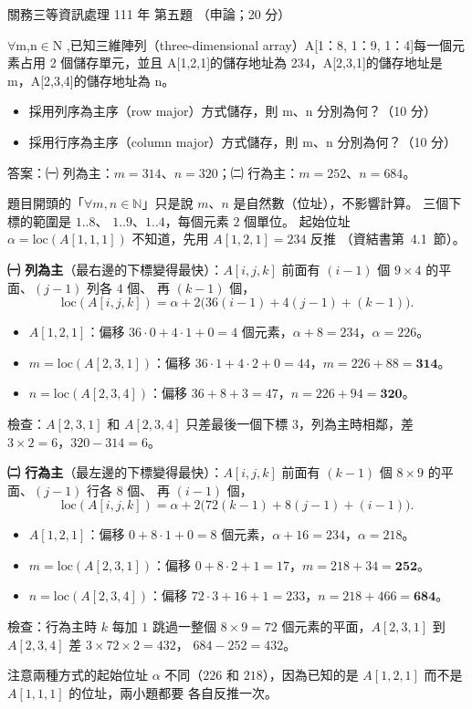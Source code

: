 \begin{pastexam}[label={px:gw3-111-ds-05}]{關務三等資訊處理 111 年 第五題}
（申論；20 分）

$\forall$m,n$\in$N ,已知三維陣列（three-dimensional array）A[1：8, 1：9, 1：4]每一個元素占用 2 個儲存單元，並且
A[1,2,1]的儲存地址為 234，A[2,3,1]的儲存地址是 m，A[2,3,4]的儲存地址為 n。
\begin{itemize}[leftmargin=2.2em]
\item[㈠] 採用列序為主序（row major）方式儲存，則 m、n 分別為何？（10 分）
\item[㈡] 採用行序為主序（column major）方式儲存，則 m、n 分別為何？（10 分）
\end{itemize}
\end{pastexam}

\begin{pastsoln}
答案：㈠ 列為主：$m = 314$、$n = 320$；㈡ 行為主：$m = 252$、$n = 684$。

題目開頭的「$\forall m, n \in \mathbb{N}$」只是說 $m$、$n$ 是自然數（位址），不影響計算。 三個下標的範圍是 $1..8$、
$1..9$、$1..4$，每個元素 $2$ 個單位。 起始位址 $\alpha = \mathrm{loc}(A[1,1,1])$ 不知道，先用 $A[1,2,1] = 234$ 反推
（資結書第~4.1~節）。

\textbf{㈠ 列為主}（最右邊的下標變得最快）：$A[i, j, k]$ 前面有 $(i - 1)$ 個 $9 \times 4$ 的平面、$(j - 1)$ 列各 $4$ 個、
再 $(k - 1)$ 個，
\[
\mathrm{loc}(A[i, j, k]) = \alpha + 2\bigl(36(i - 1) + 4(j - 1) + (k - 1)\bigr).
\]
\begin{itemize}
\item $A[1, 2, 1]$：偏移 $36 \cdot 0 + 4 \cdot 1 + 0 = 4$ 個元素，$\alpha + 8 = 234$，$\alpha = 226$。
\item $m = \mathrm{loc}(A[2, 3, 1])$：偏移 $36 \cdot 1 + 4 \cdot 2 + 0 = 44$，$m = 226 + 88 = \mathbf{314}$。
\item $n = \mathrm{loc}(A[2, 3, 4])$：偏移 $36 + 8 + 3 = 47$，$n = 226 + 94 = \mathbf{320}$。
\end{itemize}
檢查：$A[2,3,1]$ 和 $A[2,3,4]$ 只差最後一個下標 $3$，列為主時相鄰，差 $3 \times 2 = 6$，$320 - 314 = 6$。

\textbf{㈡ 行為主}（最左邊的下標變得最快）：$A[i, j, k]$ 前面有 $(k - 1)$ 個 $8 \times 9$ 的平面、$(j - 1)$ 行各 $8$ 個、
再 $(i - 1)$ 個，
\[
\mathrm{loc}(A[i, j, k]) = \alpha + 2\bigl(72(k - 1) + 8(j - 1) + (i - 1)\bigr).
\]
\begin{itemize}
\item $A[1, 2, 1]$：偏移 $0 + 8 \cdot 1 + 0 = 8$ 個元素，$\alpha + 16 = 234$，$\alpha = 218$。
\item $m = \mathrm{loc}(A[2, 3, 1])$：偏移 $0 + 8 \cdot 2 + 1 = 17$，$m = 218 + 34 = \mathbf{252}$。
\item $n = \mathrm{loc}(A[2, 3, 4])$：偏移 $72 \cdot 3 + 16 + 1 = 233$，$n = 218 + 466 = \mathbf{684}$。
\end{itemize}
檢查：行為主時 $k$ 每加 $1$ 跳過一整個 $8 \times 9 = 72$ 個元素的平面，$A[2,3,1]$ 到 $A[2,3,4]$ 差 $3 \times 72 \times 2 = 432$，
$684 - 252 = 432$。

注意兩種方式的起始位址 $\alpha$ 不同（$226$ 和 $218$），因為已知的是 $A[1,2,1]$ 而不是 $A[1,1,1]$ 的位址，兩小題都要
各自反推一次。
\end{pastsoln}
